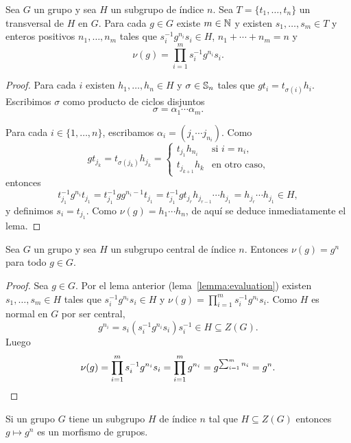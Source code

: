 
\begin{lemma}
	\label{lemma:evaluation}
	Sea $G$ un grupo y sea $H$ un subgrupo de índice $n$. Sea
	$T=\{t_1,\dots,t_n\}$ un transversal de $H$ en $G$.  Para cada $g\in G$ existe
	$m\in\mathbb{N}$ y 
	existen $s_{1},\dots,s_{m}\in T$ y enteros positivos $n_1,\dots,n_m$
	tales que 
	$s_i^{-1}g^{n_i}s_i\in H$,
	$n_1+\cdots+n_m=n$ y 
	\[
		\nu(g)=\prod_{i=1}^m s_i^{-1}g^{n_i}s_i.
	\]
\end{lemma}


\begin{proof}
	Para cada $i$ existen $h_1,\dots,h_n\in H$ y $\sigma\in\mathbb{S}_n$ tales que
	$gt_i=t_{\sigma(i)}h_i$. Escribimos $\sigma$ como producto de ciclos
	disjuntos
	\[
		\sigma=\alpha_1\cdots\alpha_m.
	\]

	Para cada $i\in\{1,\dots,n\}$, escribamos 
	$\alpha_i=(j_{1}\cdots j_{n_i})$. Como 
	\[
		g t_{j_k}=t_{\sigma(j_k)}h_{j_k}=\begin{cases}
			t_{j_1}h_{n_i} & \text{si $i=n_i$},\\
			t_{j_{k+1}}h_{k} & \text{en otro caso},
		\end{cases}
	\]
	entonces
	\[
	t_{j_1}^{-1}g^{n_i}t_{j_1}
	=t_{j_1}^{-1}gg^{n_i-1}t_{j_1}
	=t_{j_1}^{-1}gt_{j_r}h_{j_{r-1}}\cdots h_{j_1}
	=h_{j_r}\cdots h_{j_1}\in H,
	\]
	y definimos $s_i=t_{j_1}$. Como $\nu(g)=h_1\cdots h_{n}$, 
	de aquí se deduce inmediatamente el lema.
\end{proof}

\begin{proposition}
	\label{proposition:v(g)=g^n}
	Sea $G$ un grupo y sea $H$ un subgrupo central de índice $n$. 
	Entonces $\nu(g)=g^n$ para todo $g\in G$.
\end{proposition}

\begin{proof}
	Sea $g\in G$. Por el lema anterior (lema~\ref{lemma:evaluation}) existen $s_1,\dots,s_m\in
	H$ tales que $s_i^{-1}g^{n_i}s_i\in H$ y $\nu(g)=\prod_{i=1}^m
	s_i^{-1}g^{n_i}s_i$.  Como $H$ es normal en $G$ por ser central,
	\[
	g^{n_i}=s_i(s_i^{-1}g^{n_i}s_i)s_i^{-1}\in H\subseteq Z(G).
	\]
	Luego 
	\[
		\nu(g)
		=\prod_{i=1}^m s_i^{-1}g^{n_i}s_i
		=\prod_{i=1}^m g^{n_i}
		=g^{\sum_{i=1}^m n_i}
		=g^n.\qedhere 
	\]
\end{proof}

\begin{corollary}
	Si un grupo $G$ tiene un subgrupo $H$ de índice $n$ tal que $H\subseteq
	Z(G)$ entonces $g\mapsto g^n$ es un morfismo de grupos.
\end{corollary}

